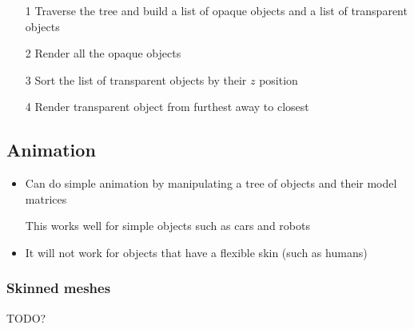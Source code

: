 \documentclass[a4paper]{article}
\begin{document}
\begin{enumerate}
  \item[1]
    Traverse the tree and build a list of opaque objects and a list of
    transparent objects

  \item[2]
    Render all the opaque objects

  \item[3]
    Sort the list of transparent objects by their $z$ position

  \item[4]
    Render transparent object from furthest away to closest

\end{enumerate}

\subsection{Animation}

\begin{itemize}
  \item
    Can do simple animation by manipulating a tree of objects and their model
    matrices

    This works well for simple objects such as cars and robots

  \item
    It will not work for objects that have a flexible skin (such as humans)

\end{itemize}

\subsubsection{Skinned meshes}

TODO?
\end{document}
